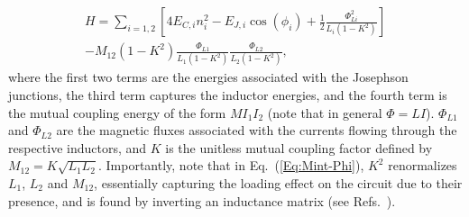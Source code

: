 \documentclass[aip,apr,twocolumn,showpacs,superscriptaddress,groupedaddress,nofootinbib,reprint]{revtex4-1}  %
\begin{document}
\begin{multline}
    H = \sum_{i = 1,2} \left[ 4E_{C,i}n_{i}^2 - E_{J,i}\cos(\phi_i) + \frac{1}{2}\frac{\Phi_{Li}^2 }{L_i(1-K^2)}\right] 
\\
    - M_{12}(1-K^2) \frac{\Phi_{L1}}{L_1(1-K^2)}\frac{\Phi_{L2}}{L_2(1-K^2)},
    \label{Eq:Mint-Phi}
\end{multline}
%
where the first two terms are the energies associated with the Josephson junctions, the third term captures the inductor energies, and the fourth term is the mutual coupling energy of the form $M I_1 I_2$ (note that in general $\Phi=LI$). $\Phi_{L1}$ and $\Phi_{L2}$ are the magnetic fluxes associated with the currents flowing through the respective inductors, and $K$ is the unitless mutual coupling factor defined by $M_{12} = K \sqrt{L_1 L_2}$.
%
Importantly, note that in Eq.~(\ref{Eq:Mint-Phi}), $K^2$ renormalizes $L_1$, $L_2$ and $M_{12}$, essentially capturing the loading effect on the circuit due to their presence, and is found by inverting an inductance matrix (see Refs.~).
\end{document}
